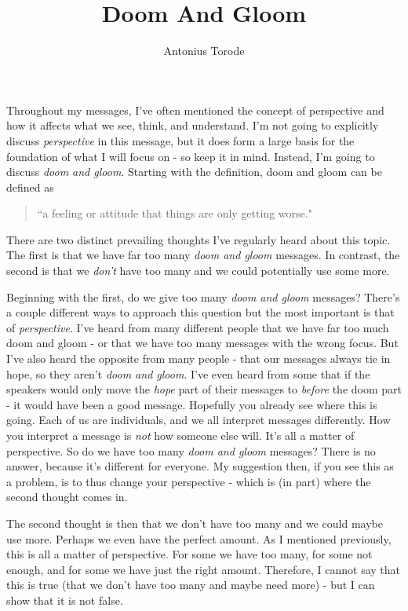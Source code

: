 \documentclass[10pt]{article}
\title{Doom And Gloom}
\author{Antonius Torode}
\begin{document}
\maketitle
\thispagestyle{fancy}

\begin{multicols}{2}

Throughout my messages, I've often mentioned the concept of perspective and how it affects what we see, think, and understand. I'm not going to explicitly discuss \textit{perspective} in this message, but it does form a large basis for the foundation of what I will focus on - so keep it in mind. Instead, I'm going to discuss \textit{doom and gloom}. Starting with the definition, doom and gloom can be defined as 

\begin{quotation}
	``a feeling or attitude that things are only getting worse." \cite{Dictionary}
\end{quotation}

There are two distinct prevailing thoughts I've regularly heard about this topic. The first is that we have far too many \textit{doom and gloom} messages. In contrast, the second is that we \textit{don't} have too many and we could potentially use some more.

Beginning with the first, do we give too many \textit{doom and gloom} messages? There's a couple different ways to approach this question but the most important is that of \textit{perspective}. I've heard from many different people that we have far too much doom and gloom - or that we have too many messages with the wrong focus. But I've also heard the opposite from many people - that our messages always tie in hope, so they aren't \textit{doom and gloom}. I've even heard from some that if the speakers would only move the \textit{hope} part of their messages to \textit{before} the doom part - it would have been a good message. Hopefully you already see where this is going. Each of us are individuals, and we all interpret messages differently. How you interpret a message is \textit{not} how someone else will. It's all a matter of perspective. So do we have too many \textit{doom and gloom} messages? There is no answer, because it's different for everyone. My suggestion then, if you see this as a problem, is to thus change your perspective - which is (in part) where the second thought comes in.

The second thought is then that we don't have too many and we could maybe use more. Perhaps we even have the perfect amount. As I mentioned previously, this is all a matter of perspective. For some we have too many, for some not enough, and for some we have just the right amount. Therefore, I cannot say that this is true (that we don't have too many and maybe need more) - but I can show that it is not false.



\end{multicols}
\end{document}

